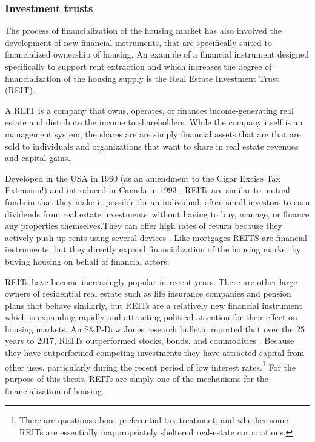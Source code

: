 \subsubsection{Investment trusts}





The process of financialization of the housing market has also involved the development of new financial instruments, that are specifically suited to financialized ownership of housing. An example of a financial instrument designed specifically to support rent extraction and which increases the degree of financialization of the housing supply is the Real Estate Investment Trust (\gls{REIT}). 

A REIT is a company that owns, operates, or finances income-generating real estate and distribute the income to shareholders. While the company itself is an management system, the shares are are simply financial assets that are that are sold to individuals and organizations that want to share in real estate revenues and capital gains. 

Developed in the USA  in 1960 (as an amendment to the Cigar Excise Tax Extension!) and introduced in Canada in 1993 \cite{GET_REITsDevelopedDates}, REITs are similar to mutual funds in that they make it possible for an individual, often small investors to earn dividends from real estate investments without having to buy, manage, or finance any properties themselves.They can offer high rates of return because they actively push up rents using several devices \cite{GET-Martine-August, farhaReportFinancializationHousing2017}. Like mortgages REITS are financial instruments, but they directly expand financialization of the housing market by buying housing on behalf of financial actors. 

REITs have become increasingly popular in recent years. There are other large owners of residential real estate such as life insurance companies and pension plans that behave similarly, but REITs are a relatively new financial instrument which is expanding rapidly and attracting political attention for their effect on housing markets.  %
An S\&P-Dow Jones research bulletin reported that over the 25 years to 2017, REITs outperformed stocks, bonds, and commodities \cite{GET-Dow-Jones-research-bulletin}. Because they have outperformed competing investments they have attracted  capital from other uses, particularly during the recent period of low interest rates.\footnote{There are questions about preferential tax treatment, and whether some REITs are essentially inappropriately sheltered real-estate corporations.} For the purpose of this thesis, REITs are simply one of the mechanisms for the financialization of housing.

